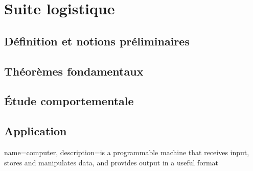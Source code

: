%
%

\chapter{Suite logistique}
\section{Définition et notions préliminaires}
\section{Théorèmes fondamentaux}
\section{Étude comportementale}
\section{Application}

\cite{Perrin}
\cite{Attract}

{
  name=computer,
  description={is a programmable machine that receives input,
               stores and manipulates data, and provides
               output in a useful format}
}
